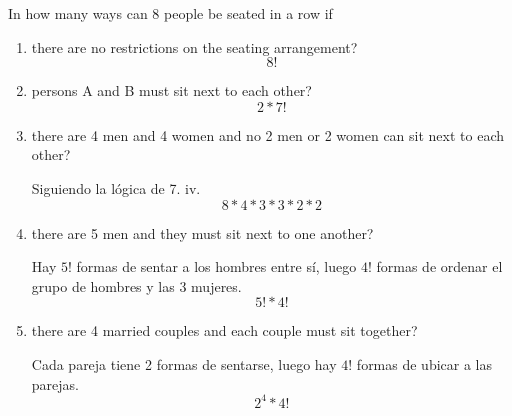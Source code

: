 \item In how many ways can 8 people be seated in a row if
\begin{enumerate}
    \item there are no restrictions on the seating arrangement?
    \[ 8! \]
    \item persons A and B must sit next to each other?
    \[ 2 * 7!\]
    \item there are 4 men and 4 women and no 2 men or 2 women can sit next to each other?

    Siguiendo la lógica de 7. iv.
    \[ 8 * 4 * 3 * 3 * 2 * 2 \]
    \item there are 5 men and they must sit next to one another?

    Hay $5!$ formas de sentar a los hombres entre sí, luego $4!$ formas de ordenar el grupo de hombres y las 3 mujeres.
    \[ 5! * 4! \]
    
    \item there are 4 married couples and each couple must sit together?

    Cada pareja tiene 2 formas de sentarse, luego hay $4!$ formas de ubicar a las parejas.
    \[ 2^4 * 4! \]
\end{enumerate}